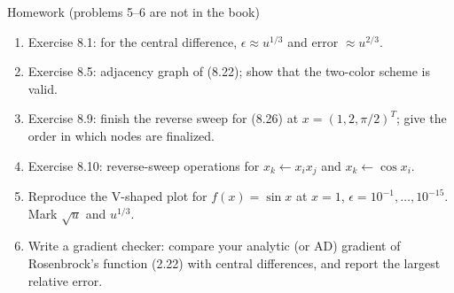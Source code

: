 \documentclass[12pt,aspectratio=169]{beamer}
\newcommand{\eps}{\epsilon}
\begin{document}
\begin{frame}{Homework {\normalsize (problems 5--6 are not in the book)}}
  \begin{enumerate}
    \item Exercise 8.1: for the central difference, $\eps\approx u^{1/3}$ and error $\approx u^{2/3}$.
    \item Exercise 8.5: adjacency graph of (8.22); show that the two-color scheme is valid.
    \item Exercise 8.9: finish the reverse sweep for (8.26) at $x=(1,2,\pi/2)^T$; give the order in which nodes are finalized.
    \item Exercise 8.10: reverse-sweep operations for $x_k\leftarrow x_ix_j$ and $x_k\leftarrow\cos x_i$.
    \item Reproduce the V-shaped plot for $f(x)=\sin x$ at $x=1$, $\eps=10^{-1},\dots,10^{-15}$.
      Mark $\sqrt u$ and $u^{1/3}$.
    \item Write a gradient checker: compare your analytic (or AD) gradient of Rosenbrock's function (2.22)
      with central differences, and report the largest relative error.
  \end{enumerate}
\end{frame}
\end{document}
